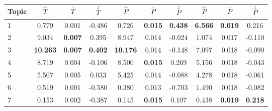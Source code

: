\begin{center}
    \label{fig:tab_topic_cent_results}\begin{small}
        \begin{tabular}{|l|c|c|c|c|c|c|c|c|c|} \hline
        Topic                   & \textbf{$\hat{T}$} & \textbf{$\overline{T}$} & \textbf{$\stackrel{z}{T}$} & \textbf{$\hat{P}$} & \textbf{$\overline{P}$} & \textbf{$\stackrel{z}{P}$}& \textbf{$\hat{P}$} & \textbf{$\overline{P}$} & \textbf{$\stackrel{z}{P}$}\\
        \hline
        1 & 0.779   & 0.001 & -0.486    & 0.726     & \textbf{0.015} & \textbf{0.438}     & \textbf{6.566} & \textbf{0.019} & 0.216     \\  
        \hline
        2 & 9.034   & \textbf{0.007} & 0.395     & 8.947     & 0.014 & -0.024    & 1.074 & 0.017 & -0.110    \\  
        \hline
        3 & \textbf{10.263}  & \textbf{0.007} & \textbf{0.402}     & \textbf{10.176}    & 0.014 & -0.148    & 7.097 & 0.018 & -0.090    \\ 
        \hline
        4 & 8.719   & 0.004 & -0.106    & 8.500     & \textbf{0.015} & 0.269     & 5.156 & 0.018 & -0.043    \\ 
        \hline
        5 & 5.507   & 0.005 & 0.033     & 5.425     & 0.014 & -0.088    & 4.278 & 0.018 & -0.061    \\  
        \hline
        6 & 0.519   & 0.001 & -0.580    & 0.380     & 0.013 & -0.703    & 1.490 & 0.018 & -0.082    \\ 
        \hline
        7 & 0.153   & 0.002 & -0.387    & 0.145     & \textbf{0.015} & 0.107     & 0.438 & \textbf{0.019} & \textbf{0.218}     \\ 
        \hline

\end{tabular}
\end{small}
\end{center}
